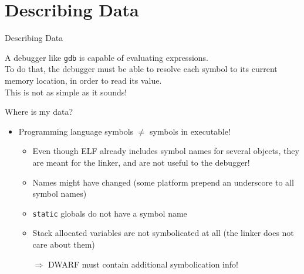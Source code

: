 
\section{Describing Data}


\begin{frame}{Describing Data}
\begin{center}
A debugger like \texttt{gdb} is capable of \alert{evaluating expressions}.\\
\medskip
To do that, the debugger must be able to resolve each symbol to its current memory location,
in order to read its value.\\
\bigskip
\large
This is not as simple as it sounds!
\end{center}
\end{frame}


\begin{frame}{Where is my data?}
\begin{itemize}
\item Programming language symbols $\ne$ symbols in executable!
\medskip
	\begin{itemize}
	\normalsize
	\item Even though ELF already includes symbol names for several objects, they are meant for the \alert{linker}, and are not useful to the debugger!
	\item Names might have changed (some platform prepend an underscore to all symbol names)
	\item \texttt{static} globals do not have a symbol name
	\item Stack allocated variables are not symbolicated at all (the linker does not care about them)
	\medskip
	\item[$\Rightarrow$] DWARF must contain additional symbolication info!
	\end{itemize}
\end{itemize}
\end{frame}


